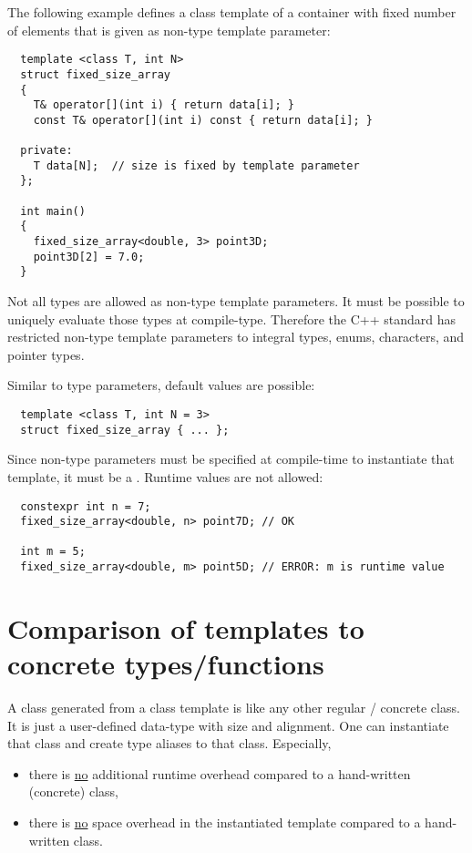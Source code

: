 The following example defines a class template of a container with fixed number of elements that is given as non-type template parameter:
\begin{verbatim}
  template <class T, int N>
  struct fixed_size_array
  {
    T& operator[](int i) { return data[i]; }
    const T& operator[](int i) const { return data[i]; }

  private:
    T data[N];  // size is fixed by template parameter
  };

  int main()
  {
    fixed_size_array<double, 3> point3D;
    point3D[2] = 7.0;
  }
\end{verbatim}

\begin{rem}
  Not all types are allowed as non-type template parameters. It must be possible to uniquely evaluate those types at compile-type. Therefore the C++
  standard has restricted non-type template parameters to integral types, enums, characters, and pointer types.
\end{rem}

Similar to type parameters, default values are possible:
\begin{verbatim}
  template <class T, int N = 3>
  struct fixed_size_array { ... };
\end{verbatim}

Since non-type parameters must be specified at compile-time to instantiate that template, it must be a . Runtime values are not allowed:
\begin{verbatim}
  constexpr int n = 7;
  fixed_size_array<double, n> point7D; // OK

  int m = 5;
  fixed_size_array<double, m> point5D; // ERROR: m is runtime value
\end{verbatim}


\section{Comparison of templates to concrete types/functions}
A class generated from a class template is like any other regular / concrete class. It is just a user-defined data-type with size and alignment.
One can instantiate that class and create type aliases to that class. Especially,
\begin{itemize}
  \item there is \underline{no} additional runtime overhead compared to a hand-written (concrete) class,
  \item there is \underline{no} space overhead in the instantiated template compared to a hand-written class.
\end{itemize}

